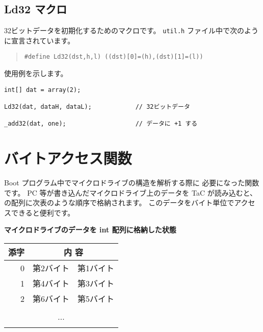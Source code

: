 \subsection{Ld32 マクロ}

32ビットデータを初期化するためのマクロです。
\verb/util.h/ ファイル中で次のように宣言されています。

\begin{quote}
\begin{verbatim}
#define Ld32(dst,h,l) ((dst)[0]=(h),(dst)[1]=(l))
\end{verbatim}
\end{quote}

使用例を示します。

\begin{mylist}
\begin{verbatim}
int[] dat = array(2);

Ld32(dat, dataH, dataL);            // 32ビットデータ

_add32(dat, one);                   // データに +1 する
\end{verbatim}
\end{mylist}

\section{バイトアクセス関数}

Boot プログラム中でマイクロドライブの構造を解析する際に
必要になった関数です。
PC 等が書き込んだマイクロドライブ上のデータを TaC が読み込むと、
\cmml の配列に次表のような順序で格納されます。
このデータをバイト単位でアクセスできると便利です。

\begin{center}
{\bf マイクロドライブのデータを int 配列に格納した状態} \\
\begin{tabular}{| r | c | c |}
\hline
\multicolumn{1}{|c|}{添字} & \multicolumn{2}{|c|}{内 容}          \\
\hline
0 & 第2バイト & 第1バイト \\
\hline
1 & 第4バイト & 第3バイト \\
\hline
2 & 第6バイト & 第5バイト \\
\hline
      &       &       \\
\multicolumn{3}{|c|}{...}           \\
      &       &       \\
\hline
\end{tabular}
\end{center}

